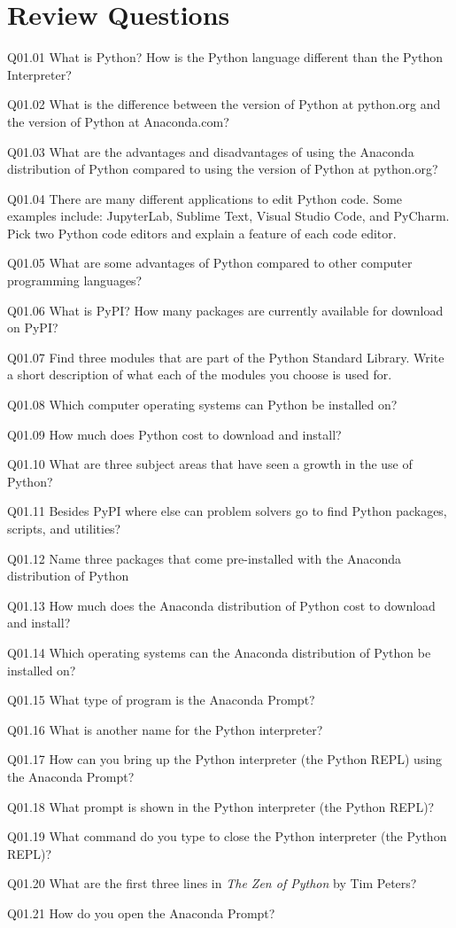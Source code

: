 \documentclass{book}
\newenvironment{problems}{}{}  %
\begin{document}
    
        \section{Review Questions}\label{review-questions}
    




    
        \begin{problems}
        Q01.01 What is Python? How is the Python language different than the
Python Interpreter?

Q01.02 What is the difference between the version of Python at
python.org and the version of Python at Anaconda.com?

Q01.03 What are the advantages and disadvantages of using the Anaconda
distribution of Python compared to using the version of Python at
python.org?

Q01.04 There are many different applications to edit Python code. Some
examples include: JupyterLab, Sublime Text, Visual Studio Code, and
PyCharm. Pick two Python code editors and explain a feature of each code
editor.

Q01.05 What are some advantages of Python compared to other computer
programming languages?

Q01.06 What is PyPI? How many packages are currently available for
download on PyPI?

Q01.07 Find three modules that are part of the Python Standard Library.
Write a short description of what each of the modules you choose is used
for.

Q01.08 Which computer operating systems can Python be installed on?

Q01.09 How much does Python cost to download and install?

Q01.10 What are three subject areas that have seen a growth in the use
of Python?

Q01.11 Besides PyPI where else can problem solvers go to find Python
packages, scripts, and utilities?

Q01.12 Name three packages that come pre-installed with the Anaconda
distribution of Python

Q01.13 How much does the Anaconda distribution of Python cost to
download and install?

Q01.14 Which operating systems can the Anaconda distribution of Python
be installed on?

Q01.15 What type of program is the Anaconda Prompt?

Q01.16 What is another name for the Python interpreter?

Q01.17 How can you bring up the Python interpreter (the Python REPL)
using the Anaconda Prompt?

Q01.18 What prompt is shown in the Python interpreter (the Python REPL)?

Q01.19 What command do you type to close the Python interpreter (the
Python REPL)?

Q01.20 What are the first three lines in \emph{The Zen of Python} by Tim
Peters?

Q01.21 How do you open the Anaconda Prompt?
        \end{problems}
\end{document}
